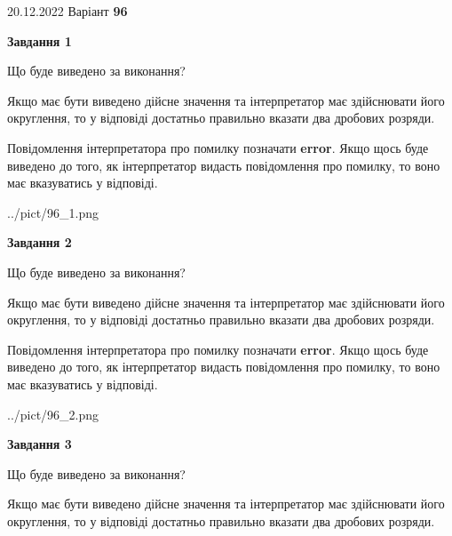 \documentclass[12pt, ukrainian]{article}
\begin{document}
{20.12.2022 Варіант \No \textbf { 96 }\par}
{
\begin {Large}

{\begin {center}\textbf{Завдання 1}\end {center}}\par
Що буде виведено за виконання? \par

Якщо має бути виведено дійсне значення та інтерпретатор має здійснювати його округлення, 
то у відповіді достатньо правильно вказати два дробових розряди.

Повідомлення інтерпретатора про помилку позначати \textbf{error}.
Якщо щось буде виведено до того, як інтерпретатор видасть повідомлення про помилку, 
то воно має вказуватись у відповіді. \par

\begin{center}
	{../pict/96_1.png}
\end{center}
\newpage

{\begin {center}\textbf{Завдання 2}\end {center}}\par
Що буде виведено за виконання? \par

Якщо має бути виведено дійсне значення та інтерпретатор має здійснювати його округлення, 
то у відповіді достатньо правильно вказати два дробових розряди.

Повідомлення інтерпретатора про помилку позначати \textbf{error}.
Якщо щось буде виведено до того, як інтерпретатор видасть повідомлення про помилку, 
то воно має вказуватись у відповіді. \par

\begin{center}
	{../pict/96_2.png}
\end{center}
\newpage

{\begin {center}\textbf{Завдання 3}\end {center}}\par
Що буде виведено за виконання? \par

Якщо має бути виведено дійсне значення та інтерпретатор має здійснювати його округлення, 
то у відповіді достатньо правильно вказати два дробових розряди.


\end{Large}}
\end{document}
